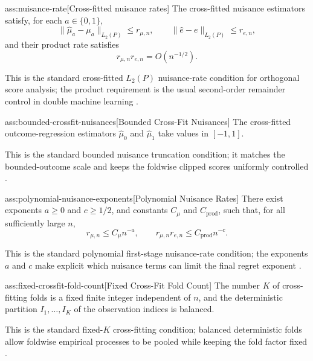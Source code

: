 \begin{assumptionv}{ass:nuisance-rate}[Cross-fitted nuisance rates]
The cross-fitted nuisance estimators satisfy, for each \(a\in\{0,1\}\),
\[
\|\widehat\mu_a-\mu_a\|_{L_2(P)}\le r_{\mu,n},
\qquad
\|\widehat e-e\|_{L_2(P)}\le r_{e,n},
\]
and their product rate satisfies
\[
r_{\mu,n}r_{e,n}=O(n^{-1/2}).
\]
\end{assumptionv}

This is the standard cross-fitted \(L_2(P)\) nuisance-rate condition for orthogonal score analysis; the product requirement is the usual second-order remainder control in double machine learning \citep{Chernozhukov2018}.

\begin{assumptionv}{ass:bounded-crossfit-nuisances}[Bounded Cross-Fit Nuisances]
The cross-fitted outcome-regression estimators \(\widehat\mu_0\) and \(\widehat\mu_1\) take values in \([-1,1]\).
\end{assumptionv}

This is the standard bounded nuisance truncation condition; it matches the bounded-outcome scale and keeps the foldwise clipped scores uniformly controlled \citep{Chernozhukov2018}.

\begin{assumptionv}{ass:polynomial-nuisance-exponents}[Polynomial Nuisance Rates]
There exist exponents \(a\ge 0\) and \(c\ge 1/2\), and constants \(C_\mu\) and \(C_{\mathrm{prod}}\), such that, for all sufficiently large \(n\),
\[
r_{\mu,n}\le C_\mu n^{-a},
\qquad
r_{\mu,n}r_{e,n}\le C_{\mathrm{prod}}n^{-c}.
\]
\end{assumptionv}

This is the standard polynomial first-stage nuisance-rate condition; the exponents \(a\) and \(c\) make explicit which nuisance terms can limit the final regret exponent \citep{Chernozhukov2018}.

\begin{assumptionv}{ass:fixed-crossfit-fold-count}[Fixed Cross-Fit Fold Count]
The number \(K\) of cross-fitting folds is a fixed finite integer independent of \(n\), and the deterministic partition \(I_1,\ldots,I_K\) of the observation indices is balanced.
\end{assumptionv}

This is the standard fixed-\(K\) cross-fitting condition; balanced deterministic folds allow foldwise empirical processes to be pooled while keeping the fold factor fixed \citep{Chernozhukov2018}.

